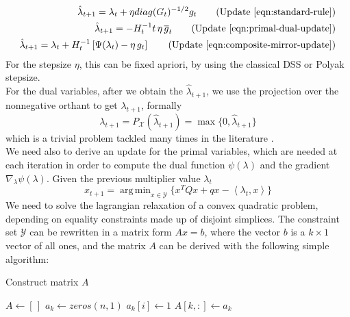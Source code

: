 \documentclass[notitlepage]{article}
\DeclareMathOperator*{\argmin}{arg\,min}
\begin{document}
\begin{subequations}
  \label{eqn:minimized}
  \begin{align}
    \hat{\lambda}_{t+1} = \lambda_t + \eta diag(G_t)^{-1/2} g_t 
    \tag{Update \eqref{eqn:standard-rule}} \\
    \hat{\lambda}_{t+1} = -H_t^{-1} t\, \eta\, \overline{g}_t
    \tag{Update \eqref{eqn:primal-dual-update}} \\
    \hat{\lambda}_{t+1} = \lambda_t + H_t^{-1} \left[ \Psi(\lambda_t) - \eta\, g_t \right] 
    \tag{Update \eqref{eqn:composite-mirror-update}}
  \end{align}
\end{subequations}
For the stepsize $\eta$, this can be fixed apriori, by using the classical DSS or Polyak stepsize.\\
 For the dual variables, after we obtain the $\hat{\lambda}_{t+1}$, we use the projection over the nonnegative orthant to get $\lambda_{t+1}$, formally
\[
  \lambda_{t+1} = P_\mathcal{X}(\hat{\lambda}_{t+1}) = \max{ \{ 0,\hat{\lambda}_{t+1} \} }
\]
which is a trivial problem tackled many times in the literature \cite{nonnegative-orthant}.\\
We need also to derive an update for the primal variables, which are needed at each iteration in order to compute the dual function $\psi( \lambda )$ and the gradient $\nabla_\lambda \psi( \lambda )$. Given the previous multiplier value $\lambda_t$
\[
  x_{t+1} = \argmin_{x \in \mathcal{Y}} \{ x^T Q x + q x - \left\langle \lambda_t,x \right\rangle \}
\]
We need to solve the lagrangian relaxation of a convex quadratic problem, depending on equality constraints made up of disjoint simplices. The constraint set $\mathcal{Y}$ can be rewritten in a matrix form $Ax = b$, where the vector $b$ is a $k \times 1$ vector of all ones, and the matrix $A$
can be derived with the following simple algorithm:
\begin{flushleft}
  \begin{minipage}{.7\textwidth}
    \begin{algorithm}[H]
      \caption{Construct matrix $A$}
      \begin{algorithmic}
          \State $A \gets \left[\,\right]$
            \State $a_k \gets zeros(n,1)$
                \State $a_k[i] \gets 1$
              \EndIf
            \EndFor
            \State $A[k,:] \gets a_k$
          \EndFor
        \EndProcedure
      \end{algorithmic}
    \end{algorithm}
  \end{minipage}  
\end{flushleft}
\end{document}
